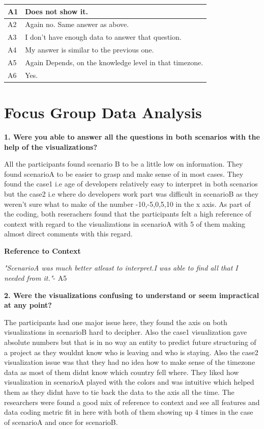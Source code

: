 \documentclass[double,12pt]{beavtex}
\begin{document}
\begin{tabular}{ |p{2cm}|p{12cm}| }
 \hline
 A1 & Does not show it.\\
 \hline
 A2 & Again no. Same answer as above.
\\ \hline
 A3 & I don't have enough data to answer that question.\\ \hline
 A4 & My answer is similar to the previous one.\\ \hline
 A5 & Again Depends, on the knowledge level in that timezone.\\ \hline
 A6 & Yes.\\
 \hline
\end{tabular}


\section{Focus Group Data Analysis}
\textbf{1. Were you able to answer all the questions in both scenarios with the help of the visualizations?}

All the participants found scenario B to be a little low on information. They found scenarioA to be easier to grasp and make sense of in most cases. They found the case1 i.e age of developers relatively easy to interpret in both scenarios but the case2 i.e where do developers work part was difficult in scenarioB as they weren't sure what to make of the number -10,-5,0,5,10 in the x axis. 
As part of the coding, both reserachers found that the participants felt a high reference of context with regard to the visualizations in scenarioA with 5 of them making almost direct comments with this regard.

\textbf{Reference to Context}

{\em "ScenarioA was much better atleast to interpret.I was able to find all that I needed from it."}- A5

\textbf{2. Were the visualizations confusing to understand or seem impractical at any point?}

The participants had one major issue here, they found the axis on both visualizations in scenarioB hard to decipher. Also the case1 visualization gave absolute numbers but that is in no way an entity to predict future structuring of a project as they wouldnt know who is leaving and who is staying. Also the case2 visualization issue was that they had no idea how to make sense of the timezone data as most of them didnt know which country fell where. They liked how visualization in scenarioA played with the colors and was intuitive which helped them as they didnt have to tie back the data to the axis all the time. The researchers were found a good mix of reference to context and see all features and data coding metric fit in here with both of them showing up 4 times in the case of scenarioA and once for scenarioB.
\end{document}

